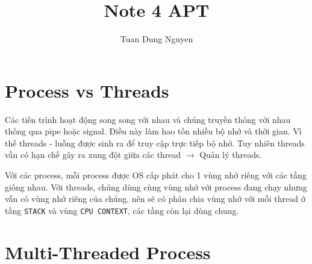 \documentclass[12pt,a4paper]{article}
\title{Note 4 APT}
\author{Tuan Dung Nguyen}
\begin{document}
	\maketitle
	\section{Process vs Threads}
	Các tiến trình hoạt động song song với nhau và chúng truyền thông với nhau thông qua pipe hoặc signal. Điều này làm hao tốn nhiều bộ nhớ và thời gian. Vì thế threads - luồng được sinh ra để truy cập trực tiếp bộ nhớ. Tuy nhiên threads vẫn có hạn chế gây ra xung đột giữa các thread $\rightarrow$ Quản lý threads.
	
	Với các process, mỗi process được OS cấp phát cho 1 vùng nhớ riêng với các tầng giống nhau. Với threads, chúng dùng cùng vùng nhớ với process đang chạy nhưng vẫn có vùng nhớ riêng của chúng, nên sẽ có phân chia vùng nhớ với mỗi thread ở tầng \texttt{STACK} và vùng \texttt{CPU CONTEXT}, các tầng còn lại dùng chung.
	
	\section{Multi-Threaded Process}
\end{document}
